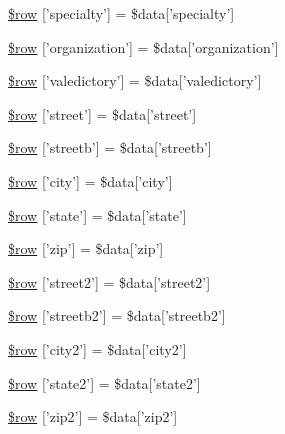 \begin{DoxyCompactItemize}
\item 
\hyperlink{miscellaneous_2addressbook_2data__create_8ejs_8php_a303951ab220aee0016b1d2fe9c668eb9}{\$row} \mbox{[}'specialty'\mbox{]} = \$data\mbox{[}'specialty'\mbox{]}
\item 
\hyperlink{miscellaneous_2addressbook_2data__create_8ejs_8php_a69213631c5b3eaacd5809b9c8d3721c2}{\$row} \mbox{[}'organization'\mbox{]} = \$data\mbox{[}'organization'\mbox{]}
\item 
\hyperlink{miscellaneous_2addressbook_2data__create_8ejs_8php_a03936db500530c616c892f3db51586a9}{\$row} \mbox{[}'valedictory'\mbox{]} = \$data\mbox{[}'valedictory'\mbox{]}
\item 
\hyperlink{miscellaneous_2addressbook_2data__create_8ejs_8php_a7333deeacbe82dc6e01b7e9e86eb3e5a}{\$row} \mbox{[}'street'\mbox{]} = \$data\mbox{[}'street'\mbox{]}
\item 
\hyperlink{miscellaneous_2addressbook_2data__create_8ejs_8php_a7ad971fc709953274ddc5ebb334b2bda}{\$row} \mbox{[}'streetb'\mbox{]} = \$data\mbox{[}'streetb'\mbox{]}
\item 
\hyperlink{miscellaneous_2addressbook_2data__create_8ejs_8php_abc2948b74989328277b5513f9ba22e4e}{\$row} \mbox{[}'city'\mbox{]} = \$data\mbox{[}'city'\mbox{]}
\item 
\hyperlink{miscellaneous_2addressbook_2data__create_8ejs_8php_a652ce4ee989023692939900810b2a70a}{\$row} \mbox{[}'state'\mbox{]} = \$data\mbox{[}'state'\mbox{]}
\item 
\hyperlink{miscellaneous_2addressbook_2data__create_8ejs_8php_a43a082263bffe64821abd5386c374ea3}{\$row} \mbox{[}'zip'\mbox{]} = \$data\mbox{[}'zip'\mbox{]}
\item 
\hyperlink{miscellaneous_2addressbook_2data__create_8ejs_8php_a56dde69befd76ea6b3273932cf517c8e}{\$row} \mbox{[}'street2'\mbox{]} = \$data\mbox{[}'street2'\mbox{]}
\item 
\hyperlink{miscellaneous_2addressbook_2data__create_8ejs_8php_a8ea62ae310fd8899b5da0f1522723386}{\$row} \mbox{[}'streetb2'\mbox{]} = \$data\mbox{[}'streetb2'\mbox{]}
\item 
\hyperlink{miscellaneous_2addressbook_2data__create_8ejs_8php_aa610cd56bbcf4b9d3b2e212c30180df4}{\$row} \mbox{[}'city2'\mbox{]} = \$data\mbox{[}'city2'\mbox{]}
\item 
\hyperlink{miscellaneous_2addressbook_2data__create_8ejs_8php_a073dd913d0ed16cf9cd0044d0e0aaa6d}{\$row} \mbox{[}'state2'\mbox{]} = \$data\mbox{[}'state2'\mbox{]}
\item 
\hyperlink{miscellaneous_2addressbook_2data__create_8ejs_8php_a5d1c42367c8080fb4096e84cb9b929b1}{\$row} \mbox{[}'zip2'\mbox{]} = \$data\mbox{[}'zip2'\mbox{]}

\end{DoxyCompactItemize}
